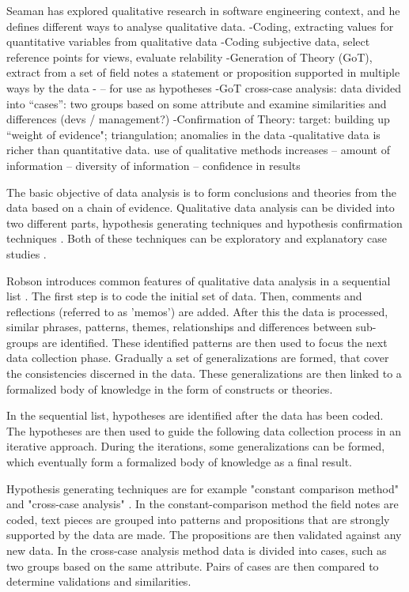 \documentclass[english]{tktltiki2}
\theoremstyle{definition}
\theoremstyle{remark}
\begin{document}
Seaman has explored qualitative research in software engineering context, and he defines different ways to analyse qualitative data. \cite{seaman1999qualitative} 
-Coding, extracting values for quantitative variables from qualitative data
-Coding subjective data, select reference points for views, evaluate relability
-Generation of Theory (GoT), extract from a set of field notes a statement or proposition supported in multiple ways by the data - – for use as hypotheses
-GoT cross-case analysis: data divided into “cases”: two groups based on some attribute and examine similarities and differences (devs / management?)
-Confirmation of Theory: target: building up “weight of evidence"; triangulation; anomalies in the data
-qualitative data is richer than quantitative data. use of qualitative methods increases
– amount of information
– diversity of information
– confidence in results

The basic objective of data analysis is to form conclusions and theories from the data based on a chain of evidence. Qualitative data analysis can be divided into two different parts, hypothesis generating techniques and hypothesis confirmation techniques \cite{runeson2009guidelines}. Both of these techniques can be exploratory and explanatory case studies \cite{runeson2009guidelines}.  

Robson introduces common features of qualitative data analysis in a sequential list \cite{robson2002real}. The first step is to code the initial set of data. Then, comments and reflections (referred to as 'memos') are added. After this the data is processed, similar phrases, patterns, themes, relationships and differences between sub-groups are identified. These identified patterns are then used to focus the next data collection phase. Gradually a set of generalizations are formed, that cover the consistencies discerned in the data. These generalizations are then linked to a formalized body of knowledge in the form of constructs or theories. 

In the sequential list, hypotheses are identified after the data has been coded. The hypotheses are then used to guide the following data collection process in an iterative approach. During the iterations, some generalizations can be formed, which eventually form a formalized body of knowledge as a final result.

Hypothesis generating techniques are for example "constant comparison method" and "cross-case analysis" \cite{seaman1999qualitative}. In the constant-comparison method the field notes are coded, text pieces are grouped into patterns and propositions that are strongly supported by the data are made. The propositions are then validated against any new data. In the cross-case analysis method data is divided into cases, such as two groups based on the same attribute. Pairs of cases are then compared to determine validations and similarities. 
\end{document}
